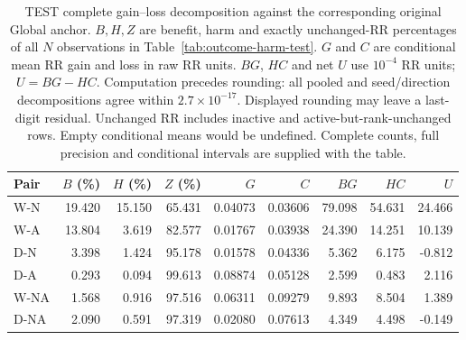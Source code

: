 \begin{table}[htbp]
\centering\footnotesize\setlength{\tabcolsep}{3pt}
\caption{TEST complete gain--loss decomposition against the corresponding original Global anchor. $B,H,Z$ are benefit, harm and exactly unchanged-RR percentages of all $N$ observations in Table~\ref{tab:outcome-harm-test}. $G$ and $C$ are conditional mean RR gain and loss in raw RR units. $BG$, $HC$ and net $U$ use $10^{-4}$ RR units; $U=BG-HC$. Computation precedes rounding: all pooled and seed/direction decompositions agree within $2.7\times10^{-17}$. Displayed rounding may leave a last-digit residual. Unchanged RR includes inactive and active-but-rank-unchanged rows. Empty conditional means would be undefined. Complete counts, full precision and conditional intervals are supplied with the table.}
\label{tab:outcome-decomposition-test}
\begin{tabular}{lrrrrrrrr}
\toprule
Pair & $B$ (\%) & $H$ (\%) & $Z$ (\%) & $G$ & $C$ & $BG$ & $HC$ & $U$\\
\midrule
W-N & 19.420 & 15.150 & 65.431 & 0.04073 & 0.03606 & 79.098 & 54.631 & 24.466\\
W-A & 13.804 & 3.619 & 82.577 & 0.01767 & 0.03938 & 24.390 & 14.251 & 10.139\\
D-N & 3.398 & 1.424 & 95.178 & 0.01578 & 0.04336 & 5.362 & 6.175 & -0.812\\
D-A & 0.293 & 0.094 & 99.613 & 0.08874 & 0.05128 & 2.599 & 0.483 & 2.116\\
W-NA & 1.568 & 0.916 & 97.516 & 0.06311 & 0.09279 & 9.893 & 8.504 & 1.389\\
D-NA & 2.090 & 0.591 & 97.319 & 0.02080 & 0.07613 & 4.349 & 4.498 & -0.149\\
\bottomrule
\end{tabular}
\end{table}
